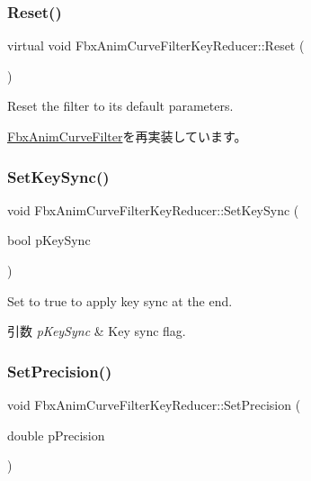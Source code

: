 \subsubsection{\texorpdfstring{Reset()}{Reset()}}
{\footnotesize\ttfamily virtual void Fbx\+Anim\+Curve\+Filter\+Key\+Reducer\+::\+Reset (\begin{DoxyParamCaption}{ }\end{DoxyParamCaption})\hspace{0.3cm}{\ttfamily [virtual]}}

Reset the filter to its default parameters. 

\hyperlink{class_fbx_anim_curve_filter_a57fb35baaaa85adb08946383cf40e811}{Fbx\+Anim\+Curve\+Filter}を再実装しています。

\mbox{\label{class_fbx_anim_curve_filter_key_reducer_adf95529fab4de5a4e3a8d3112d6ba722}} 
\subsubsection{\texorpdfstring{Set\+Key\+Sync()}{SetKeySync()}}
{\footnotesize\ttfamily void Fbx\+Anim\+Curve\+Filter\+Key\+Reducer\+::\+Set\+Key\+Sync (\begin{DoxyParamCaption}\item[{bool}]{p\+Key\+Sync }\end{DoxyParamCaption})}

Set to {\ttfamily true} to apply key sync at the end. 
\begin{DoxyParams}{引数}
{\em p\+Key\+Sync} & Key sync flag. \\
\hline
\end{DoxyParams}
\mbox{\label{class_fbx_anim_curve_filter_key_reducer_a36e172b2c259e383897828f10036e277}} 
\subsubsection{\texorpdfstring{Set\+Precision()}{SetPrecision()}}
{\footnotesize\ttfamily void Fbx\+Anim\+Curve\+Filter\+Key\+Reducer\+::\+Set\+Precision (\begin{DoxyParamCaption}\item[{double}]{p\+Precision }\end{DoxyParamCaption})}

